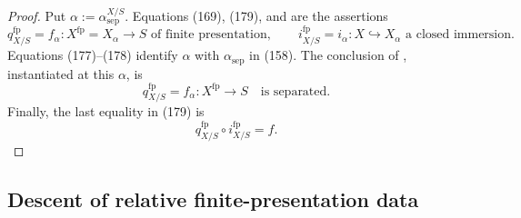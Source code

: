 \begin{proof}
  Put $\alpha:=\alpha^{X/S}_{\mathrm{sep}}$.  Equations (169), (179), and
   are the assertions
  \[
    q^{\mathrm{fp}}_{X/S}
      =f_\alpha\colon X^{\mathrm{fp}}=X_\alpha\longrightarrow S
      \text{ of finite presentation},
    \qquad
    i^{\mathrm{fp}}_{X/S}=i_\alpha\colon X\hookrightarrow X_\alpha
      \text{ a closed immersion}.
  \]
  Equations (177)--(178) identify $\alpha$ with
  $\alpha_{\mathrm{sep}}$ in (158).  The conclusion of
  , instantiated at this
  $\alpha$, is
  \[
    q^{\mathrm{fp}}_{X/S}=f_\alpha\colon X^{\mathrm{fp}}\to S
      \quad\text{is separated}.
  \]
  Finally, the last equality in (179) is
  \[
    q^{\mathrm{fp}}_{X/S}\circ i^{\mathrm{fp}}_{X/S}=f.
  \]
\end{proof}


\subsection{Descent of relative finite-presentation data}

